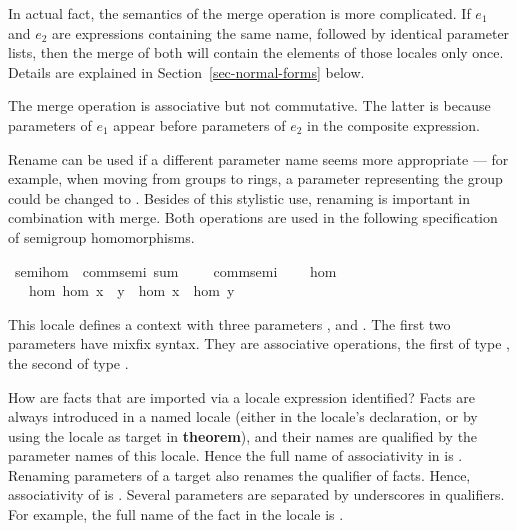 \begin{isabellebody}
\begin{isamarkuptext}
\begin{description}
  In actual fact, the semantics of the merge operation
  is more complicated.  If $e_1$ and $e_2$ are expressions containing
  the same name, followed by
  identical parameter lists, then the merge of both will contain
  the elements of those locales only once.  Details are explained in
  Section~\ref{sec-normal-forms} below.

  The merge operation is associative but not commutative.  The latter
  is because parameters of $e_1$ appear
  before parameters of $e_2$ in the composite expression.
\end{description}

  Rename can be used if a different parameter name seems more
  appropriate --- for example, when moving from groups to rings, a
  parameter  representing the group could be changed to
  .  Besides of this stylistic use, renaming is important in
  combination with merge.  Both operations are used in the following
  specification of semigroup homomorphisms.%
\end{isamarkuptext}%
\isamarkupfalse%
\ semi{\isacharunderscore}hom\ {\isacharequal}\ comm{\isacharunderscore}semi\ sum\ {\isacharparenleft}\ {\isachardoublequote}{\isasymoplus}{\isachardoublequote}\ {}{}{\isacharparenright}\ {\isacharplus}\ comm{\isacharunderscore}semi\ {\isacharplus}\isanewline
\ \ \ hom\isanewline
\ \ \ hom{\isacharcolon}\ {\isachardoublequote}hom\ {\isacharparenleft}x\ {\isasymoplus}\ y{\isacharparenright}\ {\isacharequal}\ hom\ x\ {\isasymcdot}\ hom\ y{\isachardoublequote}\isamarkuptrue%
%
\begin{isamarkuptext}%
This locale defines a context with three parameters ,
   and .  The first two parameters have
  mixfix syntax.  They are associative operations,
  the first of type , the second of
  type .  

  How are facts that are imported via a locale expression identified?
  Facts are always introduced in a named locale (either in the
  locale's declaration, or by using the locale as target in
  \textbf{theorem}), and their names are
  qualified by the parameter names of this locale.
  Hence the full name of associativity in  is
  .  Renaming parameters of a target also renames
  the qualifier of facts.  Hence, associativity of  is
  .  Several parameters are separated by
  underscores in qualifiers.  For example, the full name of the fact
   in the locale  is .


\end{isamarkuptext}
\end{isabellebody}
